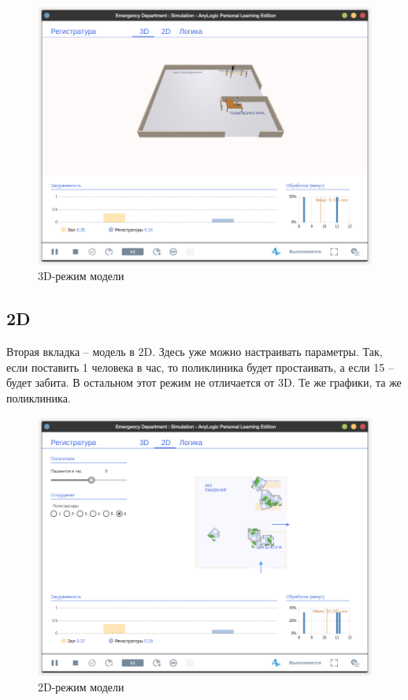 \documentclass[a4paper, article]{article}
\begin{document}
    \begin{figure}[h]
        \centering
        \includegraphics[width=0.7\linewidth]{page3d.png}
        \caption{\centering 3D-режим модели}
        \label{fig:page3d}
    \end{figure}

    \pagebreak

    \subsection{2D}

    Вторая вкладка -- модель в 2D. Здесь уже можно настраивать параметры. Так, если поставить 1 человека в час, то поликлиника будет простаивать, а если 15 -- будет забита. В остальном этот режим не отличается от 3D. Те же графики, та же поликлиника.

    \begin{figure}[h]
        \centering
        \includegraphics[width=0.7\linewidth]{page2d.png}
        \caption{\centering 2D-режим модели}
        \label{fig:page2d}
    \end{figure}

    \pagebreak
\end{document}
